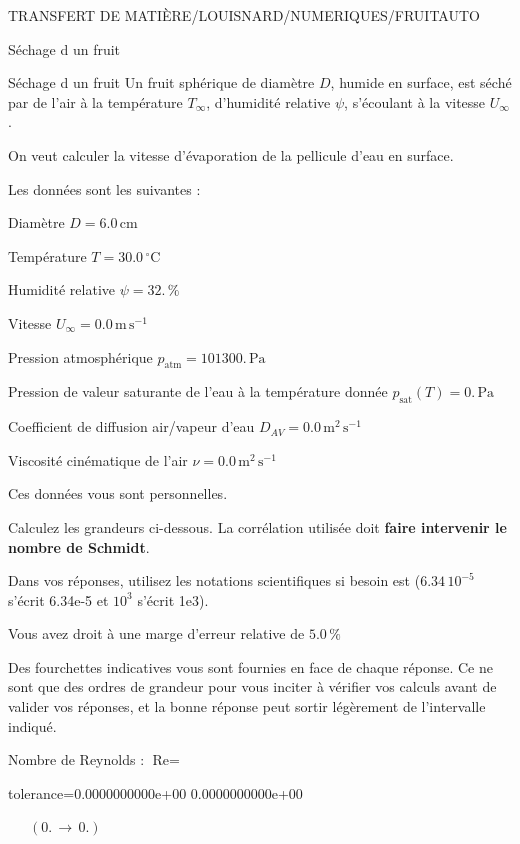 \documentclass[12pt]{article}
\begin{document}
\begin{quiz}{TRANSFERT DE MATIÈRE/LOUISNARD/NUMERIQUES/FRUITAUTO}
\begin{cloze}{Séchage d un fruit}
\end{cloze} 


 \begin{cloze}{Séchage d un fruit} 
Un fruit sphérique de diamètre $D$, humide en surface, est séché par de l'air à la température $T_\infty$, d'humidité relative $\psi$, s'écoulant à la vitesse $U_\infty$.

On veut calculer la vitesse d'évaporation de la pellicule d'eau en surface.

 

Les données sont les suivantes :

 

Diamètre $D = 6.0\,  \mathrm{cm} $

Température $T = 30.0\,  \mathrm{^\circ\mathrm{C}} $

Humidité relative $\psi = 32.\, \% $

Vitesse $U_\infty = 0.0\,  \mathrm{m}\,  \mathrm{s}^{-1} $

Pression atmosphérique $p_{\text{atm}} = 101300.\,  \mathrm{Pa} $

Pression de valeur saturante de l’eau à la température donnée $p_{\text{sat}}(T) = 0.\,  \mathrm{Pa} $

Coefficient de diffusion air/vapeur d’eau $D_{AV} = 0.0\,  \mathrm{m}^{2}\,  \mathrm{s}^{-1} $

Viscosité cinématique de l’air $\nu = 0.0\,  \mathrm{m}^{2}\,  \mathrm{s}^{-1} $

Ces données vous sont personnelles.

 

Calculez les grandeurs ci-dessous. La corrélation utilisée doit \textbf{faire intervenir le nombre de Schmidt}.

Dans vos réponses, utilisez les notations scientifiques si besoin est ($6.34\, 10^{-5}$ s'écrit 6.34e-5 et $10^{3}$ s'écrit 1e3).

Vous avez droit à une marge d'erreur relative de $5.0\, \% $

Des fourchettes indicatives vous sont fournies en face de chaque réponse. Ce ne sont que des ordres de grandeur pour vous inciter à vérifier vos calculs avant de valider vos réponses, et la bonne réponse peut sortir légèrement de l'intervalle indiqué.

 

Nombre de Reynolds : $\text{Re} =  $
\begin{numerical}[points=1] 
\item[tolerance={0.0000000000e+00}] 0.0000000000e+00 
\end{numerical} 
 $\,$ 
 $ \quad (0. \, \rightarrow \, 0.) $ 


\end{cloze}
\end{quiz}
\end{document}
